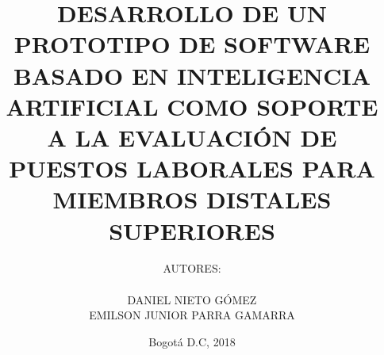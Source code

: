 

\title{DESARROLLO DE UN PROTOTIPO DE SOFTWARE BASADO EN INTELIGENCIA ARTIFICIAL COMO SOPORTE A LA EVALUACIÓN DE PUESTOS LABORALES PARA MIEMBROS DISTALES SUPERIORES}

\author{AUTORES:\\\vspace{1cm}\\DANIEL NIETO GÓMEZ\\EMILSON JUNIOR PARRA GAMARRA}



\directortitle{}



\date{Bogotá D.C, 2018}







\onehalfspace \maketitle

\tableofcontents

\newpage \listoffigures

\newpage \listoftables

\setlength{\parskip}{\baselineskip} 
\newpage



	


\newpage


